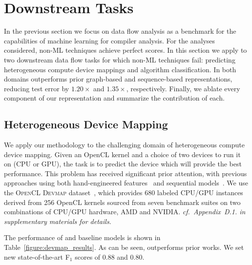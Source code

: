 \section{Downstream Tasks}
\label{sec:downstream_tasks}

In the previous section we focus on data flow analysis as a benchmark for the
capabilities of machine learning for compiler analysis. For the analyses
considered, non-ML techniques achieve perfect scores. In this section we apply
\programl to two downstream data flow tasks for which non-ML techniques fail:
predicting heterogeneous compute device mappings and algorithm classification.
In both domains \programl outperforms prior graph-based and sequence-based
representations, reducing test error by $1.20\times$ and $1.35\times$,
respectively. Finally, we ablate every component of our representation and
summarize the contribution of each.

\subsection{Heterogeneous Device Mapping}

We apply our methodology to the challenging domain of heterogeneous compute
device mapping. Given an OpenCL kernel and a choice of two devices to run it on
(CPU or GPU), the task is to predict the device which will provide the best
performance. This problem has received significant prior attention, with
previous approaches using both hand-engineered features~\citep{Grewe2013} and
sequential models~\citep{Ben-nun2018,Cummins2017b}. We use the \textsc{OpenCL
Devmap} dataset~\citep{Cummins2017b}, which provides 680 labeled CPU/GPU
instances derived from 256 OpenCL kernels sourced from seven benchmark suites on
two combinations of CPU/GPU hardware, AMD and NVIDIA. \emph{cf.\ Appendix~D.1.
in supplementary materials for details.}

The performance of \programl and baseline models is shown in
Table~\ref{figure:devmap_results}. As can be seen, \programl outperforms prior
works. We set new state-of-the-art F$_1$ scores of 0.88 and 0.80.

\begin{table}
  \centering%
  
  \caption{%
    Predicting heterogeneous compute device mapping.
  }%
  \label{figure:devmap_results} %
\end{table}

\begin{table}
  \centering
  
  \caption{%
    Algorithm classification comparison to state-of-the-art, and ablations.
  }
  \label{tab:classify}
\end{table}

